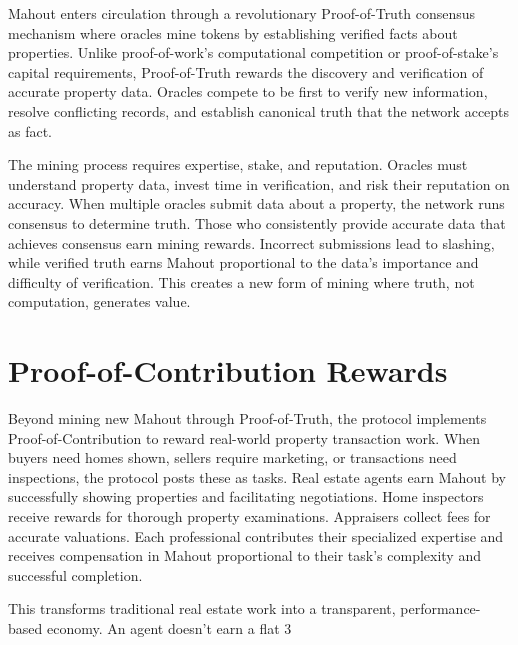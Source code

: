 Mahout enters circulation through a revolutionary Proof-of-Truth consensus mechanism where oracles mine tokens by establishing verified facts about properties. Unlike proof-of-work's computational competition or proof-of-stake's capital requirements, Proof-of-Truth rewards the discovery and verification of accurate property data. Oracles compete to be first to verify new information, resolve conflicting records, and establish canonical truth that the network accepts as fact.

The mining process requires expertise, stake, and reputation. Oracles must understand property data, invest time in verification, and risk their reputation on accuracy. When multiple oracles submit data about a property, the network runs consensus to determine truth. Those who consistently provide accurate data that achieves consensus earn mining rewards. Incorrect submissions lead to slashing, while verified truth earns Mahout proportional to the data's importance and difficulty of verification. This creates a new form of mining where truth, not computation, generates value.

\section{Proof-of-Contribution Rewards}

Beyond mining new Mahout through Proof-of-Truth, the protocol implements Proof-of-Contribution to reward real-world property transaction work. When buyers need homes shown, sellers require marketing, or transactions need inspections, the protocol posts these as tasks. Real estate agents earn Mahout by successfully showing properties and facilitating negotiations. Home inspectors receive rewards for thorough property examinations. Appraisers collect fees for accurate valuations. Each professional contributes their specialized expertise and receives compensation in Mahout proportional to their task's complexity and successful completion.

This transforms traditional real estate work into a transparent, performance-based economy. An agent doesn't earn a flat 3%

